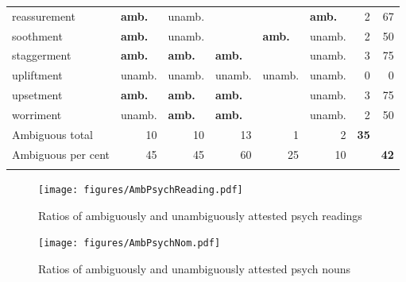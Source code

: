 \begin{sidewaystable}[ph!]
\begin{small}
\begin{tabular}{llllllrr}
 reassurement   & \textbf{amb.}   & unamb. &        &        & \textbf{amb.}   & 2 & 67 \\
soothment      & \textbf{amb.}   & unamb. &        & \textbf{amb.}   & unamb. & 2 & 50 \\
 staggerment    & \textbf{amb.}   & \textbf{amb.}   & \textbf{amb.}   &        & unamb. & 3 & 75 \\
upliftment     & unamb.   & unamb. & unamb. & unamb. & unamb. & 0 & 0 \\
 upsetment      & \textbf{amb.}   & \textbf{amb.}   & \textbf{amb.}   &        & unamb. & 3 & 75 \\
worriment      & unamb. & \textbf{amb.}   & \textbf{amb.}   &        & unamb. & 2 & 50 \\
\midrule
Ambiguous total & \multicolumn{1}{r}{10} & \multicolumn{1}{r}{10} & \multicolumn{1}{r}{13} & \multicolumn{1}{r}{1} & \multicolumn{1}{r}{2} & \multicolumn{1}{r}{\textbf{35}} & \textendash{} \\
Ambiguous per cent & \multicolumn{1}{r}{45} & \multicolumn{1}{r}{45} & \multicolumn{1}{r}{60} & \multicolumn{1}{r}{25} & \multicolumn{1}{r}{10} & \textendash{} & \multicolumn{1}{r}{\textbf{42}}\\
\lspbottomrule
\end{tabular}
\end{small}
\end{sidewaystable}

\begin{figure}[p]
\texttt{[image: figures/AmbPsychReading.pdf]}
\caption{Ratios of ambiguously and unambiguously attested psych readings}
\label{fig:AmbiguityByReadingPsych}
\end{figure}

\begin{figure}[p]
\texttt{[image: figures/AmbPsychNom.pdf]}
\caption{Ratios of ambiguously and unambiguously attested psych nouns}
\label{fig:AmbiguityByNomPsych}
\end{figure}


